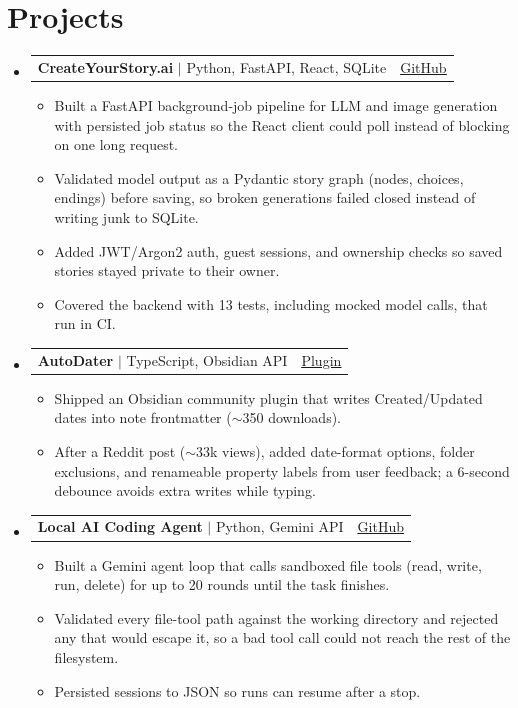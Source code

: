 \documentclass[letterpaper,11pt]{article}
\makeatletter
\newcommand{\resumeItem}[1]{
  \item\small{#1}
}
\newcommand{\resumeProjectHeading}[2]{
    \item
    \begin{tabular*}{0.97\textwidth}[t]{l@{\extracolsep{\fill}}r}
      \small#1 & \small#2 \\
    \end{tabular*}
}
\newcommand{\resumeSubHeadingListStart}{\begin{itemize}[leftmargin=0.15in, label={}, itemsep=5pt, parsep=0pt, topsep=2pt]}
\newcommand{\resumeSubHeadingListEnd}{\end{itemize}}
\newcommand{\resumeItemListStart}{\begin{itemize}[itemsep=2.5pt, parsep=0pt, topsep=2pt, leftmargin=0.15in]}
\newcommand{\resumeItemListEnd}{\end{itemize}}
\makeatother
\begin{document}
\section{Projects}
    \resumeSubHeadingListStart

    \resumeProjectHeading
        {\textbf{CreateYourStory.ai} $|$ Python, FastAPI, React, SQLite}
        {\href{https://github.com/cheuyin/createyourstory.ai}{\underline{GitHub}}}
          \resumeItemListStart
            \resumeItem{Built a FastAPI background-job pipeline for LLM and image generation with persisted job status so the React client could poll instead of blocking on one long request.}
            \resumeItem{Validated model output as a Pydantic story graph (nodes, choices, endings) before saving, so broken generations failed closed instead of writing junk to SQLite.}
            \resumeItem{Added JWT/Argon2 auth, guest sessions, and ownership checks so saved stories stayed private to their owner.}
            \resumeItem{Covered the backend with 13 tests, including mocked model calls, that run in CI.}
          \resumeItemListEnd

    \resumeProjectHeading
        {\textbf{AutoDater} $|$ TypeScript, Obsidian API}
        {\href{https://community.obsidian.md/plugins/autodater}{\underline{Plugin}}}
          \resumeItemListStart
            \resumeItem{Shipped an Obsidian community plugin that writes Created/Updated dates into note frontmatter ($\sim$350 downloads).}
            \resumeItem{After a Reddit post ($\sim$33k views), added date-format options, folder exclusions, and renameable property labels from user feedback; a 6-second debounce avoids extra writes while typing.}
          \resumeItemListEnd

    \resumeProjectHeading
        {\textbf{Local AI Coding Agent} $|$ Python, Gemini API}
        {\href{https://github.com/cheuyin/ai-agent-python}{\underline{GitHub}}}
          \resumeItemListStart
            \resumeItem{Built a Gemini agent loop that calls sandboxed file tools (read, write, run, delete) for up to 20 rounds until the task finishes.}
            \resumeItem{Validated every file-tool path against the working directory and rejected any that would escape it, so a bad tool call could not reach the rest of the filesystem.}
            \resumeItem{Persisted sessions to JSON so runs can resume after a stop.}
          \resumeItemListEnd

    \resumeSubHeadingListEnd

\end{document}
